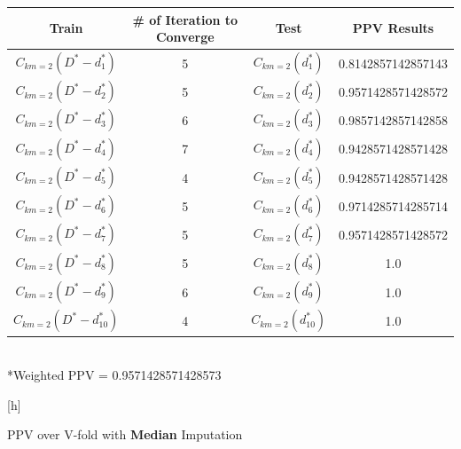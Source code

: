 \documentclass{article}
\begin{document}
\begin{enumerate}
\begin{table}[h]
				\centering
				\begin{tabular}{c||c| c|c}
					\\
					\hline
					Train & \# of Iteration to Converge & Test & PPV Results\\
					\hline
					$C_{km=2}(D^* - d^*_1)$ & 5 & $C_{km=2}( d^*_1)$&0.8142857142857143\\
					$C_{km=2}(D^* - d^*_2)$ & 5 & $C_{km=2}( d^*_2)$&0.9571428571428572\\
					$C_{km=2}(D^* - d^*_3)$ & 6 & $C_{km=2}( d^*_3)$&0.9857142857142858\\
					$C_{km=2}(D^* - d^*_4)$ & 7 & $C_{km=2}( d^*_4)$&0.9428571428571428\\
					$C_{km=2}(D^* - d^*_5)$ & 4 & $C_{km=2}( d^*_5)$&0.9428571428571428\\
					$C_{km=2}(D^* - d^*_6)$ & 5 & $C_{km=2}( d^*_6)$&0.9714285714285714\\
					$C_{km=2}(D^* - d^*_7)$ & 5 & $C_{km=2}( d^*_7)$&0.9571428571428572\\
					$C_{km=2}(D^* - d^*_8)$ & 5 & $C_{km=2}( d^*_8)$&1.0\\
					$C_{km=2}(D^* - d^*_9)$ & 6 & $C_{km=2}( d^*_9)$ &1.0\\
					$C_{km=2}(D^* - d^*_10)$ & 4 & $C_{km=2}( d^*_10)$&1.0\\
					\hline	
				\end{tabular} \\
				*Weighted PPV = 0.9571428571428573
			\end{table}[h] \\			

			\begin{table}[h]
				\caption{PPV over V-fold with \textbf{Median} Imputation}


\end{table}
\end{enumerate}
\end{document}
